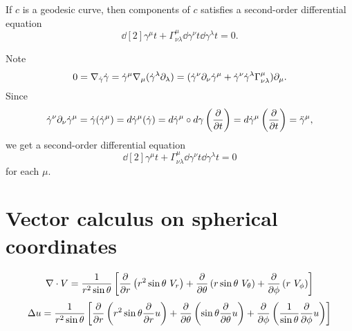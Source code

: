 \documentclass[11pt]{article}
\let\realsection\section
\renewcommand\section{\newpage\realsection}
\begin{document}
\begin{thm}
If $c$ is a geodesic curve, then components of $c$ satisfies a second-order differential equation
\[\dd[2]{\gamma^\mu}{t}+\Gamma_{\nu\lambda}^\mu\dd{\gamma^\nu}{t}\dd{\gamma^\lambda}{t}=0.\]
\end{thm}
\begin{pf}
Note
\[0=\nabla_{\dot\gamma}\dot\gamma=\dot\gamma^\mu\nabla_\mu(\dot\gamma^\lambda\pd_\lambda)
=(\dot\gamma^\nu\pd_\nu\dot\gamma^\mu+\dot\gamma^\nu\dot\gamma^\lambda\Gamma_{\nu\lambda}^\mu)\pd_\mu.\]
Since
\[\dot\gamma^\nu\pd_\nu\dot\gamma^\mu=\dot\gamma(\dot\gamma^\mu)=d\dot\gamma^\mu(\dot\gamma)=d\dot\gamma^\mu\circ d\gamma\left(\pd{t}\right)=d\dot\gamma^\mu\left(\pd{t}\right)=\ddot\gamma^\mu,\]
we get a second-order differential equation
\[\dd[2]{\gamma^\mu}{t}+\Gamma_{\nu\lambda}^\mu\dd{\gamma^\nu}{t}\dd{\gamma^\lambda}{t}=0\]
for each $\mu$.
\end{pf}














\section{Vector calculus on spherical coordinates}


\[
\del\cdot V=\frac1{r^2\sin\theta}\left[  \pd{r}\left(r^2\sin\theta\ V_r\right) + \pd{\theta}\left(r\sin\theta\ V_\theta\right) + \pd{\phi}\left(r\ V_\phi\right)  \right]
\]
\[\Delta u=\frac1{r^2\sin\theta}\left[\pd{r}\left(r^2\sin\theta\pd{r}u\right)+\pd{\theta}\left(\sin\theta\pd{\theta}u\right)+\pd{\phi}\left(\frac1{\sin\theta}\pd{\phi}u\right)\right]\]
\end{document}
